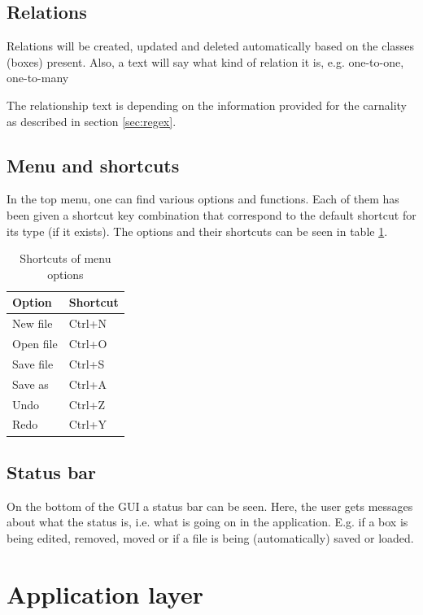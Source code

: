 \subsection{Relations}
Relations will be created, updated and deleted automatically based on the classes (boxes) present. Also, a text will say what kind of relation it is, e.g. one-to-one, one-to-many

The relationship text is depending on the information provided for the carnality as described in section \ref{sec:regex}.

\subsection{Menu and shortcuts}

In the top menu, one can find various options and functions. Each of them has been given a shortcut key combination that correspond to the default shortcut for its type (if it exists). The options and their shortcuts can be seen in table \ref{tab:menu_shortcut}.

\begin{table}[htbp]
\centering
\begin{tabular}{|l|l|}
\hline
\textbf{Option} & \textbf{Shortcut}\\
\hline
New file & Ctrl+N\\
\hline
Open file & Ctrl+O\\
\hline
Save file & Ctrl+S\\
\hline
Save as & Ctrl+A\\
\hline
Undo & Ctrl+Z\\
\hline
Redo & Ctrl+Y\\
\hline
\end{tabular}
\caption{Shortcuts of menu options}
\label{tab:menu_shortcut}
\end{table}

\subsection{Status bar}

On the bottom of the GUI a status bar can be seen. Here, the user gets messages about what the status is, i.e. what is going on in the application. E.g. if a box is being edited, removed, moved or if a file is being (automatically) saved or loaded.

\section{Application layer}
\label{sec:app_layer}

